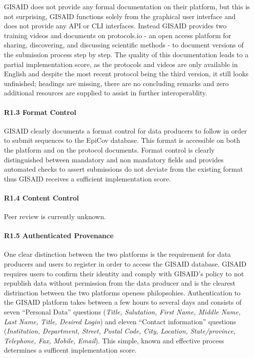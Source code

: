 \documentclass{article}
\begin{document}
GISAID does not provide any formal documentation on their platform, but
this is not surprising, GISAID functions solely from the graphical user
interface and does not provide any API or CLI interfaces. Instead GISAID
provides two training videos and documents on protocols.io - an open
access platform for sharing, discovering, and discussing scientific
methods - to document versions of the submission process step by step.
The quality of this documentation leads to a partial implementation
score, as the protocols and videos are only available in English and
despite the most recent protocol being the third version, it still looks
unfinished; headings are missing, there are no concluding remarks and
zero additional resources are supplied to assist in further
interoperablity.

\hypertarget{r1.3-format-control}{%
\paragraph{R1.3 Format Control}\label{r1.3-format-control}}

GISAID clearly documents a format control for data producers to follow
in order to submit sequences to the EpiCov database. This format is
accessible on both the platform and on the protocol documents. Format
control is clearly distinguished between mandatory and non mandatory
fields and provides automated checks to assert submissions do not
deviate from the existing format thus GISAID receives a sufficient
implementation score.

\hypertarget{r1.4-content-control}{%
\paragraph{R1.4 Content Control}\label{r1.4-content-control}}

Peer review is currently unknown.

\hypertarget{r1.5-authenticated-provenance}{%
\paragraph{R1.5 Authenticated
Provenance}\label{r1.5-authenticated-provenance}}

One clear distinction between the two platforms is the requirement for
data producers and users to register in order to access the GISAID
database. GISAID requires users to confirm their identity and comply
with GISAID's policy to not republish data without permission from the
data producer and is the clearest distrinction between the two platforms
openess philopsohies. Authentication to the GISAID platform takes
between a few hours to several days and consists of seven ``Personal
Data'' questions (\emph{Title, Salutation, First Name, Middle Name, Last
Name, Title, Desired Login}) and eleven ``Contact information''
questions (\emph{Institution, Department, Street, Postal Code, City,
Location, State/province, Telephone, Fax, Mobile, Email}). This simple,
known and effective process determines a sufficent implementation score.
\end{document}
